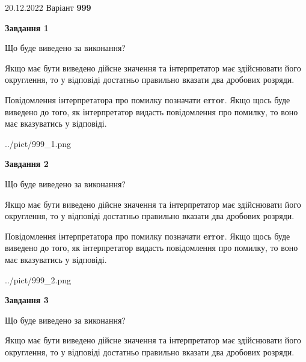 \documentclass[12pt, ukrainian]{article}
\begin{document}
{20.12.2022 Варіант \No \textbf { 999 }\par}
{
\begin {Large}

{\begin {center}\textbf{Завдання 1}\end {center}}\par
Що буде виведено за виконання? \par

Якщо має бути виведено дійсне значення та інтерпретатор має здійснювати його округлення, 
то у відповіді достатньо правильно вказати два дробових розряди.

Повідомлення інтерпретатора про помилку позначати \textbf{error}.
Якщо щось буде виведено до того, як інтерпретатор видасть повідомлення про помилку, 
то воно має вказуватись у відповіді. \par

\begin{center}
	{../pict/999_1.png}
\end{center}
\newpage

{\begin {center}\textbf{Завдання 2}\end {center}}\par
Що буде виведено за виконання? \par

Якщо має бути виведено дійсне значення та інтерпретатор має здійснювати його округлення, 
то у відповіді достатньо правильно вказати два дробових розряди.

Повідомлення інтерпретатора про помилку позначати \textbf{error}.
Якщо щось буде виведено до того, як інтерпретатор видасть повідомлення про помилку, 
то воно має вказуватись у відповіді. \par

\begin{center}
	{../pict/999_2.png}
\end{center}
\newpage

{\begin {center}\textbf{Завдання 3}\end {center}}\par
Що буде виведено за виконання? \par

Якщо має бути виведено дійсне значення та інтерпретатор має здійснювати його округлення, 
то у відповіді достатньо правильно вказати два дробових розряди.


\end{Large}}
\end{document}
